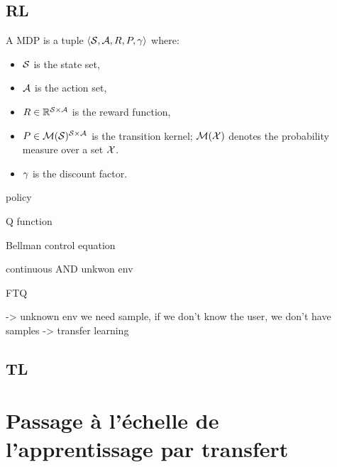 \documentclass[french]{beamer}
\begin{document}
    \subsection{RL}
    \begin{frame}

        A MDP is a tuple $\langle{}\mathcal{S},\mathcal{A},R,P,\gamma\rangle{}$ where:
        \begin{itemize}
            \item  $\mathcal{S}$ is the state set,
            \item  $\mathcal{A}$ is the action set,
            \item $R\in\mathbb{R}^{\mathcal{S} \times \mathcal{A}}$ is the reward function,
            \item $P\in \mathcal{M}(\mathcal{S})^{\mathcal{S} \times \mathcal{A}}$ is the transition kernel; $\mathcal{M}(\mathcal{X})$ denotes the probability measure over a set $\mathcal{X}$.
            \item $\gamma$ is the discount factor.
        \end{itemize}

    \end{frame}

    \begin{frame}
        policy

        Q function

        Bellman control equation

    \end{frame}

    \begin{frame}

        continuous AND unkwon env

        FTQ

        -> unknown env we need sample, if we don't know the user, we don't have samples -> transfer learning

    \end{frame}

    \subsection{TL}
    \begin{frame}

    \end{frame}

    \section{Passage à l'échelle de l'apprentissage par transfert}
\end{document}
